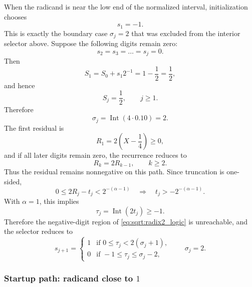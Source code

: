 \documentclass[11pt]{article}
\DeclareMathOperator{\Int}{Int}
\numberwithin{equation}{section}
\begin{document}
When the radicand is near the low end of the normalized interval, initialization chooses
\[
  s_1 = -1.
\]
This is exactly the boundary case $\sigma_j=2$ that was excluded from the interior selector above.
Suppose the following digits remain zero:
\[
  s_2 = s_3 = \dotsc = s_j = 0.
\]
Then
\begin{equation}
  \label{eq:sqrt:radix2_near_quarter_s1}
  S_1 = S_0 + s_1 2^{-1} = 1 - \frac{1}{2} = \frac{1}{2},
\end{equation}
and hence
\begin{equation}
  \label{eq:sqrt:radix2_near_quarter_sj}
  S_j = \frac{1}{2}, \qquad j\ge 1.
\end{equation}
Therefore
\begin{equation}
  \label{eq:sqrt:radix2_near_quarter_sigma}
  \sigma_j = \Int(4\cdot 0.10) = 2.
\end{equation}
The first residual is
\begin{equation}
  \label{eq:sqrt:radix2_near_quarter_r1}
  R_1 = 2\left(X-\frac{1}{4}\right) \ge 0,
\end{equation}
and if all later digits remain zero, the recurrence reduces to
\begin{equation}
  \label{eq:sqrt:radix2_near_quarter_zero_recurrence}
  R_k = 2R_{k-1}, \qquad k\ge 2.
\end{equation}
Thus the residual remains nonnegative on this path.
Since truncation is one-sided,
\[
  0 \le 2R_j - t_j < 2^{-(\alpha-1)}
  \quad \Longrightarrow \quad
  t_j > -2^{-(\alpha-1)}.
\]
With $\alpha=1$, this implies
\begin{equation}
  \label{eq:sqrt:radix2_near_quarter_tau}
  \tau_j = \Int(2t_j) \ge -1.
\end{equation}
Therefore the negative-digit region of \cref{eq:sqrt:radix2_logic} is unreachable, and the selector
reduces to
\begin{equation}
  \label{eq:sqrt:radix2_logic_near_quarter}
  s_{j+1} =
  \begin{cases}
    1 & \text{if } 0 \le \tau_j < 2(\sigma_j+1), \\
    0 & \text{if } -1 \le \tau_j \le \sigma_j - 2,
  \end{cases}
  \qquad \sigma_j = 2.
\end{equation}

\subsubsection{Startup path: radicand close to \texorpdfstring{$1$}{1}}
\label{sssec:sqrt:radix2_near_one}
\end{document}
